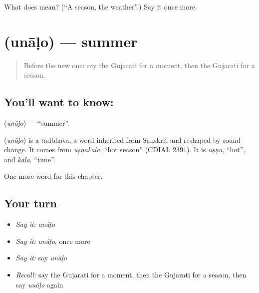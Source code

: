 \begin{tcolorbox}[breakable,colback=teal!4,colframe=teal!35!black,title={Before you move on}]
What does  mean? (\textquotedblleft{}A season, the weather\textquotedblright{}.) Say it once more.
\end{tcolorbox}
\section[\texorpdfstring{\gu{ઉનાળો} (unāḷo)}{ઉનાળો (unāḷo)}]{ (unāḷo) — summer}

\label{lesson:GU-C93-unalo}



\begin{quote}
Before the new one: say the Gujarati for a moment, then the Gujarati for a season.
\end{quote}

\subsection*{You'll want to know: }
\textbf{} (\emph{unāḷo}) — \textquotedblleft{}summer\textquotedblright{}.

\begin{cousinweb}
\textbf{} (\emph{unāḷo}) is a tadbhava, a word inherited from Sanskrit and reshaped by sound change. It comes from \emph{uṣṇakāla}, \textquotedblleft{}hot season\textquotedblright{} (CDIAL 2391). It is \emph{uṣṇa}, \textquotedblleft{}hot\textquotedblright{}, and \emph{kāla}, \textquotedblleft{}time\textquotedblright{}.
\end{cousinweb}

\begin{grammarlens}[title={What you've built}]
One more word for this chapter.
\end{grammarlens}

\subsection*{Your turn}
\begin{itemize}
\raggedright
  \item \emph{Say it:} \emph{unāḷo}
  \item \emph{Say it:} \emph{unāḷo}, once more
  \item \emph{Say it:} say \emph{unāḷo}
  \item \emph{Recall:} say the Gujarati for a moment, then the Gujarati for a season, then say \emph{unāḷo} again
\end{itemize}

